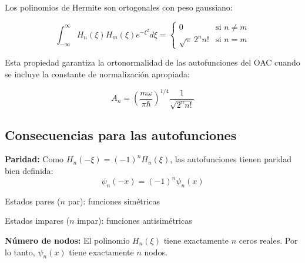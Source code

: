 Los polinomios de Hermite son ortogonales con peso gaussiano:

\begin{equation}
	\int_{-\infty}^{\infty} H_n(\xi) H_m(\xi) e^{-\xi^2} d\xi = \begin{cases}
		0 & \text{si } n \neq m \\
		\sqrt{\pi} \, 2^n n! & \text{si } n = m
	\end{cases}
\end{equation}

Esta propiedad garantiza la ortonormalidad de las autofunciones del OAC cuando se incluye la constante de normalización apropiada:

\begin{equation}
	A_n = \left(\frac{m\omega}{\pi\hbar}\right)^{1/4} \frac{1}{\sqrt{2^n n!}}
\end{equation}

\subsection{Consecuencias para las autofunciones}

\textbf{Paridad:} Como $H_n(-\xi) = (-1)^n H_n(\xi)$, las autofunciones tienen paridad bien definida:
\begin{equation}
	\psi_n(-x) = (-1)^n \psi_n(x)
\end{equation}

Estados pares ($n$ par): funciones simétricas

Estados impares ($n$ impar): funciones antisimétricas

\textbf{Número de nodos:} El polinomio $H_n(\xi)$ tiene exactamente $n$ ceros reales. Por lo tanto, $\psi_n(x)$ tiene exactamente $n$ nodos.

